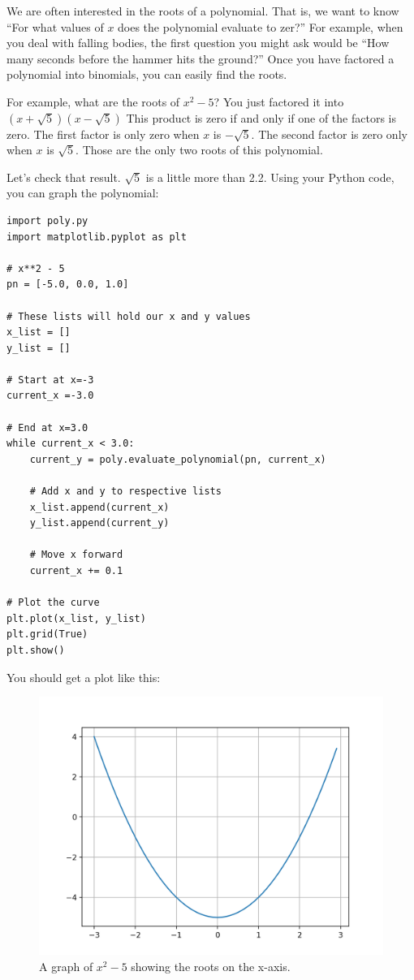 We are often interested in the roots of a polynomial. That is, we want
to know ``For what values of $x$ does the polynomial evaluate to
zer?'' For example, when you deal with falling bodies, the first
question you might ask would be ``How many seconds before the hammer
hits the ground?''  Once you have factored a polynomial into
binomials, you can easily find the roots.

For example, what are the roots of $x^2 - 5$? You just factored it
into $(x + \sqrt{5})(x - \sqrt{5})$ This product is zero if and only
if one of the factors is zero. The first factor is only zero when $x$
is $-\sqrt{5}$. The second factor is zero only when $x$ is
$\sqrt{5}$. Those are the only two roots of this
polynomial.

Let's check that result. $\sqrt{5}$ is a little more than 2.2.  Using
your Python code, you can graph the polynomial:
\begin{Verbatim}
import poly.py
import matplotlib.pyplot as plt

# x**2 - 5
pn = [-5.0, 0.0, 1.0]

# These lists will hold our x and y values
x_list = []
y_list = []

# Start at x=-3
current_x =-3.0

# End at x=3.0
while current_x < 3.0:
    current_y = poly.evaluate_polynomial(pn, current_x)

    # Add x and y to respective lists
    x_list.append(current_x)
    y_list.append(current_y)

    # Move x forward
    current_x += 0.1

# Plot the curve
plt.plot(x_list, y_list)
plt.grid(True)
plt.show()
\end{Verbatim}

You should get a plot like this:
\begin{figure}[htbp]
    \centering
    \includegraphics[width=\textwidth]{sqrt5.png}
    \caption{A graph of $x^2-5$ showing the roots on the x-axis.}
    \label{fig:sqrt5}
\end{figure}

